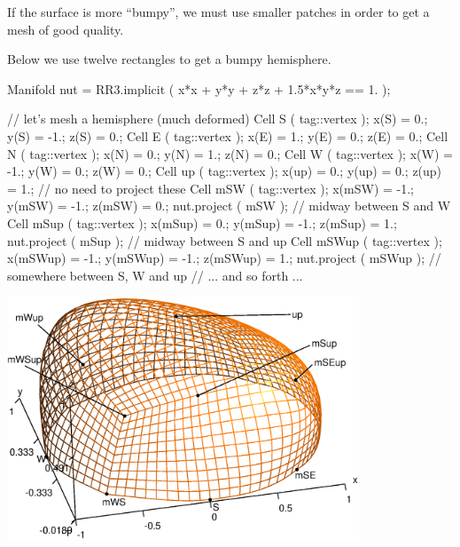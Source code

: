 If the surface is more ``bumpy'',
we must use smaller patches in order to get a mesh of good quality.

Below we use twelve rectangles to get a bumpy hemisphere.
\vfil\eject

\verbatim
   Manifold nut = RR3.implicit ( x*x + y*y + z*z + 1.5*x*y*z == 1. );

   // let's mesh a hemisphere (much deformed)
   Cell S ( tag::vertex );    x(S)  =   0.;   y(S)  =  -1.;   z(S)  =  0.;
   Cell E ( tag::vertex );    x(E)  =   1.;   y(E)  =   0.;   z(E)  =  0.;
   Cell N ( tag::vertex );    x(N)  =   0.;   y(N)  =   1.;   z(N)  =  0.;
   Cell W ( tag::vertex );    x(W)  =  -1.;   y(W)  =   0.;   z(W)  =  0.;
   Cell up ( tag::vertex );   x(up) =   0.;   y(up) =   0.;   z(up) =  1.;
   // no need to project these
   Cell mSW ( tag::vertex );  x(mSW) = -1.;   y(mSW) = -1.;   z(mSW) = 0.;
   nut.project ( mSW );  // midway between S and W
   Cell mSup  ( tag::vertex );  x(mSup) =  0.;   y(mSup) = -1.;   z(mSup) = 1.;
   nut.project ( mSup );  // midway between S and up
   Cell mSWup ( tag::vertex );  x(mSWup) = -1.;  y(mSWup) = -1.;  z(mSWup) = 1.;
   nut.project ( mSWup );  // somewhere between S, W and up
   // ... and so forth ...
\endverbatim
	
{ 
\centerline{\includegraphics[width=105mm]{hemisphere-2.eps}} }

